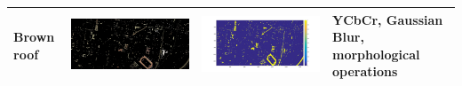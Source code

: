 \documentclass[fleqn,10pt]{SelfArx} %
\begin{document}
\begin{table}
\begin{tabular}{>{\centering\arraybackslash}M{8mm}cc>{\centering\arraybackslash}M{20mm}}
\midrule 
\vspace{-3cm}
\hspace{-0.4cm}
Brown roof & \includegraphics[clip,scale=0.07]{18rgb.jpg} & \includegraphics[trim={6cm 2.5cm 4.5cm 1.6cm},clip,scale=0.18]{18.jpg} & \vspace{-3cm} YCbCr, Gaussian Blur, morphological operations \\ 
\bottomrule
\end{tabular} 
\end{table}
\end{document}
